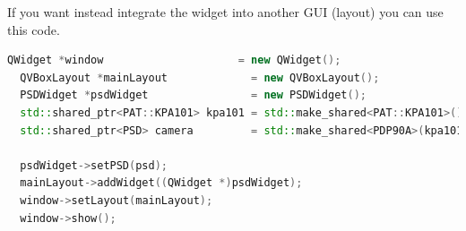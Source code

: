 If you want instead integrate the widget into another GUI (layout) you
can use this code.

\begin{lstlisting}[language=c++, gobble=2]
  QWidget *window                     = new QWidget();
  QVBoxLayout *mainLayout             = new QVBoxLayout();
  PSDWidget *psdWidget                = new PSDWidget();
  std::shared_ptr<PAT::KPA101> kpa101 = std::make_shared<PAT::KPA101>();
  std::shared_ptr<PSD> camera         = std::make_shared<PDP90A>(kpa101);
  
  psdWidget->setPSD(psd);
  mainLayout->addWidget((QWidget *)psdWidget);
  window->setLayout(mainLayout);
  window->show();
\end{lstlisting}

